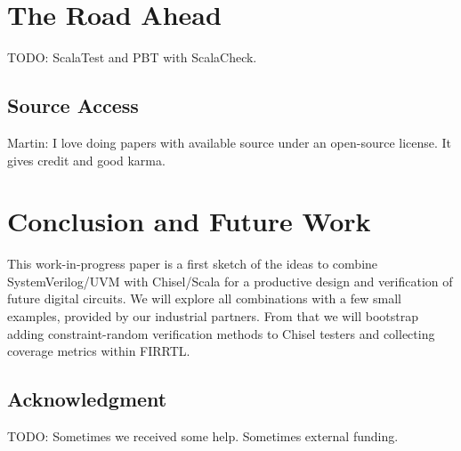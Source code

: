 \documentclass[a4paper, conference]{IEEEtran}
\newcommand{\todo}[1]{{\color{olive} TODO: #1}}
\newcommand{\martin}[1]{{\color{blue} Martin: #1}}
\begin{document}
\section{The Road Ahead}

\todo{ScalaTest and PBT with ScalaCheck.}


\subsection{Source Access}

\martin{I love doing papers with available source under an
open-source license. It gives credit and good karma.}


\section{Conclusion and Future Work}
\label{sec:conclusion}

This work-in-progress paper is a first sketch of the ideas to combine SystemVerilog/UVM
with Chisel/Scala for a productive design and verification of future digital circuits.
We will explore all combinations with a few small examples, provided by our industrial
partners.
From that we will bootstrap adding constraint-random verification methods to Chisel
testers and collecting coverage metrics within FIRRTL.

\subsection*{Acknowledgment}

\todo{Sometimes we received some help. Sometimes external funding.}






\end{document}
